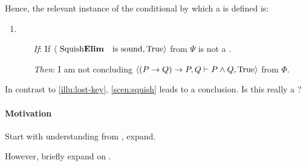 \begin{note}
  Hence, the relevant instance of the conditional by which a \requ{} is defined is:

  \begin{enumerate}[label=]
  \item
    \begin{itemize}
    \item[\emph{If}:]
      If \(\pv{\text{\sqE{} is sound}}{\text{True}}\) from \(\Psi\) is not a \fc{}.
    \item[\emph{Then}:]
      I am not concluding \(\langle (P \rightarrow Q) \rightarrow P, Q \vdash P \land Q, \text{True} \rangle\) from \(\Phi\).
    \end{itemize}
  \end{enumerate}

  In contrast to \autoref{illu:lost-key}, \autoref{scen:squish} leads to a conclusion.
  Is this really a \requ{}?
\end{note}

\paragraph{Motivation}

\begin{note}
  Start with understanding from , expand.

  However, briefly expand on \sqE{}.
\end{note}

